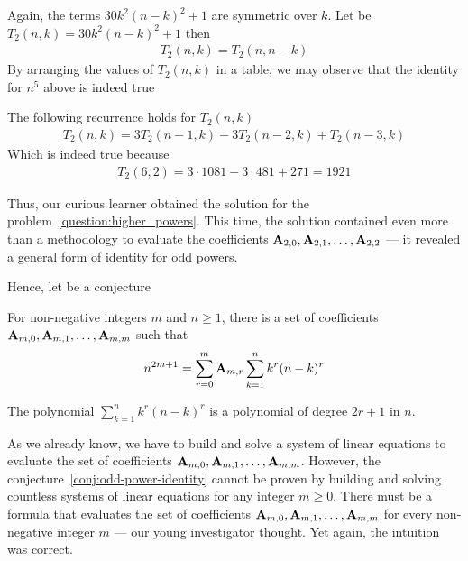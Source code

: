Again, the terms $30k^2(n-k)^2 + 1$ are symmetric over $k$.
Let be $T_2 (n,k) = 30k^2(n-k)^2 + 1$ then
\begin{align*}
    T_2 (n,k) = T_2 (n,n-k)
\end{align*}
By arranging the values of $T_{2} (n,k)$ in a table, we may observe that the identity for $n^5$ above is indeed true

The following recurrence holds for $T_2 (n,k)$
\begin{align*}
    T_2 (n, k) = 3T_2(n-1, k) - 3T_2(n-2, k) + T_2(n-3, k)
\end{align*}
Which is indeed true because
\begin{align*}
    T_2 (6,2) = 3 \cdot 1081 - 3 \cdot 481 + 271 = 1921
\end{align*}

Thus, our curious learner obtained the solution for the problem~\eqref{question:higher_powers}.
This time, the solution contained even more than a methodology to evaluate
the coefficients ${\mathbf{A}} \sb{2,0}, {\mathbf{A}} \sb{2,1}, \ldots, {\mathbf{A}} \sb{2,2}$ ---
it revealed a general form of identity for odd powers.

Hence, let be a conjecture
\begin{conjecture}
    \label{conj:odd-power-identity}
    For non-negative integers $m$ and $n\geq1$,
    there is a set of coefficients ${\mathbf{A}} \sb{m,0}, {\mathbf{A}} \sb{m,1}, \ldots, {\mathbf{A}} \sb{m,m}$ such that
    \begin{align*}
        n^{2m+1} = \sum_{r=0}^{m} {\mathbf{A}} \sb{m,r} \sum_{k=1}^{n} k^r (n-k)^r
    \end{align*}
\end{conjecture}
The polynomial $\sum_{k=1}^{n} k^r (n-k)^r$ is a polynomial of degree $2r+1$ in $n$.

As we already know, we have to build and solve a system of linear equations to evaluate the set of coefficients
${\mathbf{A}} \sb{m,0}, {\mathbf{A}} \sb{m,1}, \ldots, {\mathbf{A}} \sb{m,m}$.
However, the conjecture~\eqref{conj:odd-power-identity} cannot be proven by building and solving countless
systems of linear equations for any integer $m \geq 0$.
There must be a formula that evaluates the set of coefficients ${\mathbf{A}} \sb{m,0}, {\mathbf{A}} \sb{m,1}, \ldots, {\mathbf{A}} \sb{m,m}$
for every non-negative integer $m$ --- our young investigator thought.
Yet again, the intuition was correct.
